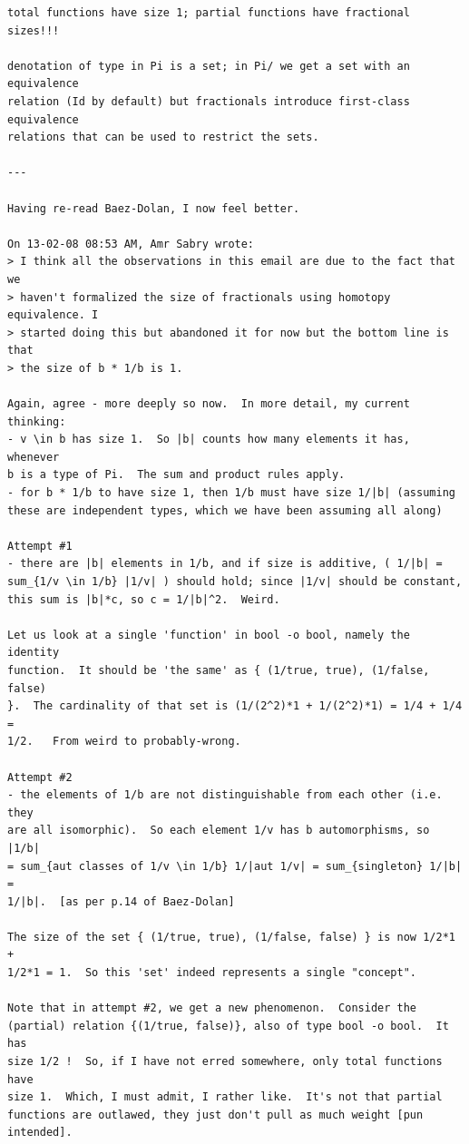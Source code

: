 \documentclass{llncs}
\begin{document}
\begin{verbatim}
total functions have size 1; partial functions have fractional sizes!!!

denotation of type in Pi is a set; in Pi/ we get a set with an equivalence
relation (Id by default) but fractionals introduce first-class equivalence
relations that can be used to restrict the sets.

---

Having re-read Baez-Dolan, I now feel better.

On 13-02-08 08:53 AM, Amr Sabry wrote:
> I think all the observations in this email are due to the fact that we
> haven't formalized the size of fractionals using homotopy equivalence. I
> started doing this but abandoned it for now but the bottom line is that
> the size of b * 1/b is 1.

Again, agree - more deeply so now.  In more detail, my current thinking:
- v \in b has size 1.  So |b| counts how many elements it has, whenever 
b is a type of Pi.  The sum and product rules apply.
- for b * 1/b to have size 1, then 1/b must have size 1/|b| (assuming 
these are independent types, which we have been assuming all along)

Attempt #1
- there are |b| elements in 1/b, and if size is additive, ( 1/|b| = 
sum_{1/v \in 1/b} |1/v| ) should hold; since |1/v| should be constant, 
this sum is |b|*c, so c = 1/|b|^2.  Weird.

Let us look at a single 'function' in bool -o bool, namely the identity 
function.  It should be 'the same' as { (1/true, true), (1/false, false) 
}.  The cardinality of that set is (1/(2^2)*1 + 1/(2^2)*1) = 1/4 + 1/4 = 
1/2.   From weird to probably-wrong.

Attempt #2
- the elements of 1/b are not distinguishable from each other (i.e. they 
are all isomorphic).  So each element 1/v has b automorphisms, so |1/b| 
= sum_{aut classes of 1/v \in 1/b} 1/|aut 1/v| = sum_{singleton} 1/|b| = 
1/|b|.  [as per p.14 of Baez-Dolan]

The size of the set { (1/true, true), (1/false, false) } is now 1/2*1 + 
1/2*1 = 1.  So this 'set' indeed represents a single "concept".

Note that in attempt #2, we get a new phenomenon.  Consider the 
(partial) relation {(1/true, false)}, also of type bool -o bool.  It has 
size 1/2 !  So, if I have not erred somewhere, only total functions have 
size 1.  Which, I must admit, I rather like.  It's not that partial 
functions are outlawed, they just don't pull as much weight [pun intended].


\end{verbatim}
\end{document}

